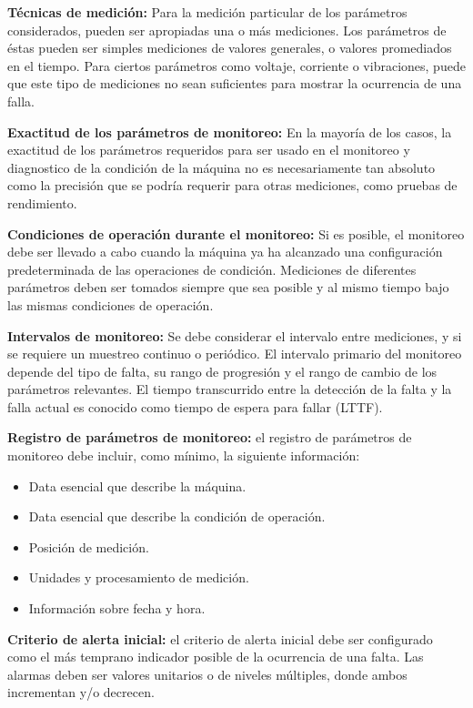 \begin{description}
\item \textbf{Técnicas de medición:} Para la medición particular de los parámetros considerados, pueden ser apropiadas una o más mediciones. Los parámetros de éstas pueden ser simples mediciones de valores generales, o valores promediados en el tiempo. Para ciertos parámetros como voltaje, corriente o vibraciones, puede que este tipo de mediciones no sean suficientes para mostrar la ocurrencia de una falla.

\item \textbf{Exactitud de los parámetros de monitoreo:} En la mayoría de los casos, la exactitud de los parámetros requeridos para ser usado en el monitoreo y diagnostico de la condición de la máquina no es necesariamente tan absoluto como la precisión que se podría requerir para otras mediciones, como pruebas de rendimiento.

\item \textbf{Condiciones de operación durante el monitoreo:} Si es posible, el monitoreo debe ser llevado a cabo cuando la máquina ya ha alcanzado una configuración predeterminada de las operaciones de condición. Mediciones de diferentes parámetros deben ser tomados siempre que sea posible y al mismo tiempo bajo las mismas condiciones de operación.

\item \textbf{Intervalos de monitoreo:} Se debe considerar el intervalo entre mediciones, y si se requiere un muestreo continuo o periódico. El intervalo primario del monitoreo depende del tipo de falta, su rango de progresión y el rango de cambio de los parámetros relevantes. El tiempo transcurrido entre la detección de la falta y la falla actual es conocido como tiempo de espera para fallar (LTTF).

\item \textbf{Registro de parámetros de monitoreo:} el registro de parámetros de monitoreo debe incluir, como mínimo, la siguiente información:
\begin{itemize}
\item Data esencial que describe la máquina.
\item Data esencial que describe la condición de operación.
\item Posición de medición.
\item Unidades y procesamiento de medición.
\item Información sobre fecha y hora.
\end{itemize}

\item \textbf{Criterio de alerta inicial:} el criterio de alerta inicial debe ser configurado  como el más temprano indicador posible de la ocurrencia de una falta. Las alarmas deben ser valores unitarios o de niveles múltiples, donde ambos incrementan y/o decrecen. 


\end{description}
